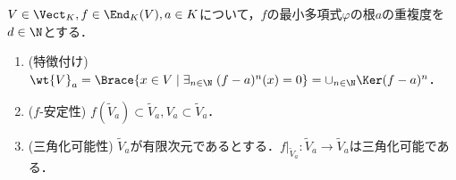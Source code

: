 \documentclass[uplatex, dvipdfmx]{jsreport}
\begin{document}
\begin{proposition}[一般固有空間への制限は三角化可能である]\label{prop-algorithm-for-making-triangular-matrices}
    $V\in\Vect_K,f\in\End_K(V),a\in K$について，$f$の最小多項式$\varphi$の根$a$の重複度を$d\in\N$とする．
    \begin{enumerate}
        \item (特徴付け) $\wt{V}_a=\Brace{x\in V\mid\exists_{n\in\N}\;(f-a)^n(x)=0}=\cup_{n\in\N}\Ker(f-a)^n$．
        \item ($f$-安定性) $f(\widetilde{V}_a)\subset\widetilde{V}_a,V_a\subset\widetilde{V}_a$．
        \item (三角化可能性) $\widetilde{V}_a$が有限次元であるとする．$f|_{\widetilde{V}_a}:\widetilde{V}_a\to\widetilde{V}_a$は三角化可能である．
    \end{enumerate}
\end{proposition}
\end{document}
